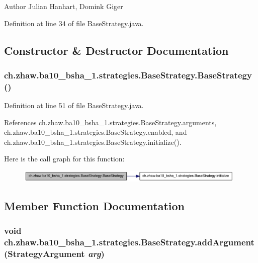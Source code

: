 \begin{DoxyAuthor}{Author}
Julian Hanhart, Domink Giger 
\end{DoxyAuthor}


Definition at line 34 of file BaseStrategy.java.

\subsection{Constructor \& Destructor Documentation}
\hypertarget{classch_1_1zhaw_1_1ba10__bsha__1_1_1strategies_1_1BaseStrategy_a22dc9cd6d939460308ad8d065e4ec646}{
\subsubsection[{BaseStrategy}]{\setlength{\rightskip}{0pt plus 5cm}ch.zhaw.ba10\_\-bsha\_\-1.strategies.BaseStrategy.BaseStrategy ()}}
\label{classch_1_1zhaw_1_1ba10__bsha__1_1_1strategies_1_1BaseStrategy_a22dc9cd6d939460308ad8d065e4ec646}


Definition at line 51 of file BaseStrategy.java.

References ch.zhaw.ba10\_\-bsha\_\-1.strategies.BaseStrategy.arguments, ch.zhaw.ba10\_\-bsha\_\-1.strategies.BaseStrategy.enabled, and ch.zhaw.ba10\_\-bsha\_\-1.strategies.BaseStrategy.initialize().

Here is the call graph for this function:\nopagebreak
\begin{figure}[H]
\begin{center}
\leavevmode
\includegraphics[width=312pt]{classch_1_1zhaw_1_1ba10__bsha__1_1_1strategies_1_1BaseStrategy_a22dc9cd6d939460308ad8d065e4ec646_cgraph}
\end{center}
\end{figure}


\subsection{Member Function Documentation}
\hypertarget{classch_1_1zhaw_1_1ba10__bsha__1_1_1strategies_1_1BaseStrategy_ad106d9d501550fe475a4a01032632597}{
\subsubsection[{addArgument}]{\setlength{\rightskip}{0pt plus 5cm}void ch.zhaw.ba10\_\-bsha\_\-1.strategies.BaseStrategy.addArgument ({\bf StrategyArgument} {\em arg})}}
\label{classch_1_1zhaw_1_1ba10__bsha__1_1_1strategies_1_1BaseStrategy_ad106d9d501550fe475a4a01032632597}



